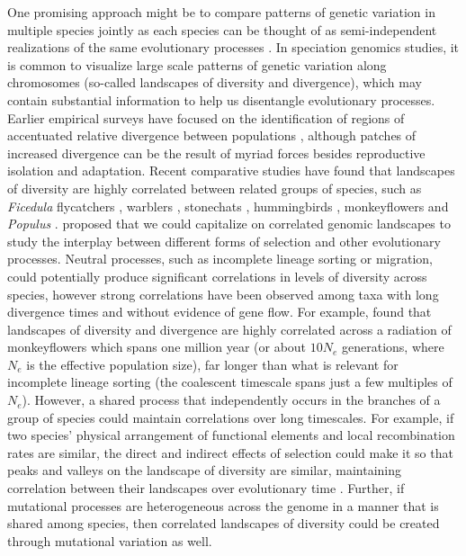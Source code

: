 One promising approach might be to compare patterns of genetic variation in multiple species jointly
as each species can be thought of as semi-independent realizations of the same evolutionary processes \citep[c.f.][]{won_divergence_2005}.
In speciation genomics studies, it is common to visualize large scale patterns of genetic variation along chromosomes (so-called landscapes of diversity and divergence),
which may contain substantial information to help us disentangle evolutionary processes.
Earlier empirical surveys have focused on the identification of regions of 
accentuated relative divergence between populations \parencite{cruickshank_reanalysis_2014, harr_genomic_2006, turner_genomic_2005},
although patches of increased divergence can be the result of myriad forces besides reproductive isolation and adaptation.
Recent comparative studies have found that landscapes of diversity are highly correlated between related groups of species,
such as \textit{Ficedula} flycatchers \citep{burri_linked_2015, ellegren_genomic_2012}, warblers \citep{irwin_recurrent_2016}, stonechats \citep{doren_correlated_2017}, hummingbirds \citep{battey_evidence_2020}, monkeyflowers \citep{stankowski_widespread_2019}  and \textit{Populus} \citep{wang_evidence_2020}.
\citet{burri_interpreting_2017} proposed that we could capitalize on correlated genomic landscapes to study the interplay between different forms of selection and other evolutionary processes.
Neutral processes, such as incomplete lineage sorting or migration, could potentially produce significant correlations in levels of diversity across species,
however strong correlations have been observed among taxa with long divergence times and without evidence of gene flow. 
For example, \citet{stankowski_widespread_2019} found that landscapes of diversity and divergence are highly correlated across a radiation of monkeyflowers which spans one million year (or about $10N_e$ generations, where $N_e$ is the effective population size),
far longer than what is relevant for incomplete lineage sorting (\ie the coalescent timescale spans just a few multiples of $N_e$).
However, a shared process that independently occurs in the branches of a group of species could maintain correlations over long timescales.
For example, if two species' physical arrangement of functional elements and local recombination rates are similar,
the direct and indirect effects of selection could make it so that peaks and valleys on the landscape of diversity are similar,
maintaining correlation between their landscapes over evolutionary time \parencite{burri_interpreting_2017, delmore_comparative_2018}.
Further, if mutational processes are heterogeneous across the genome in a manner that is shared among species,
then correlated landscapes of diversity could be created through mutational variation as well. 

